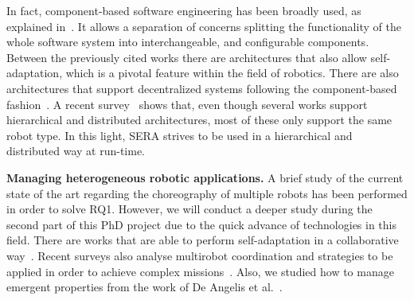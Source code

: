 In fact, component-based software engineering has been broadly used, as explained in~\cite{Brugali2009}. 
It allows a separation of concerns splitting the functionality of the whole software system into interchangeable, and configurable components. 
Between the previously cited works there are architectures that also allow self-adaptation, which is a pivotal feature within the field of robotics.
There are also architectures that support decentralized systems following the component-based fashion~\cite{Lesire2016}.
A recent survey~\cite{Yan2013} shows that, even though several works support hierarchical and distributed architectures, most of these only support the same robot type. 
In this light, SERA strives to be used in a hierarchical and distributed way at run-time.

\textbf{Managing heterogeneous robotic applications.}
A brief study of the current state of the art regarding the choreography of multiple robots has been performed in order to solve RQ1.
However, we will conduct a deeper study during the second part of this PhD project due to the quick advance of technologies in this field.
There are works  that are able to perform self-adaptation in a collaborative way~\cite{DeLemos2013}.
Recent surveys also analyse multirobot coordination and strategies to be applied in order to achieve complex missions~\cite{Yan2013}.
Also, we studied how to manage emergent properties from the work of De Angelis et al.~\cite{DeAngelis2016}.
